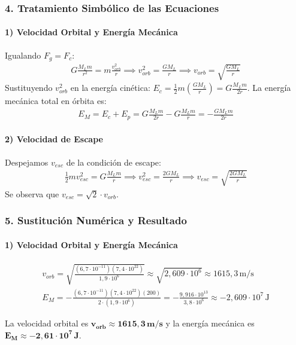 \subsubsection*{4. Tratamiento Simbólico de las Ecuaciones}
\paragraph{1) Velocidad Orbital y Energía Mecánica}
Igualando $F_g = F_c$:
\begin{gather}
    G \frac{M_L m}{r^2} = m \frac{v_{orb}^2}{r} \implies v_{orb}^2 = \frac{G M_L}{r} \implies v_{orb} = \sqrt{\frac{G M_L}{r}}
\end{gather}
Sustituyendo $v_{orb}^2$ en la energía cinética: $E_c = \frac{1}{2}m\left(\frac{G M_L}{r}\right) = G\frac{M_L m}{2r}$.
La energía mecánica total en órbita es:
\begin{gather}
    E_M = E_c + E_p = G\frac{M_L m}{2r} - G\frac{M_L m}{r} = -\frac{G M_L m}{2r}
\end{gather}
\paragraph{2) Velocidad de Escape}
Despejamos $v_{esc}$ de la condición de escape:
\begin{gather}
    \frac{1}{2}mv_{esc}^2 = G\frac{M_L m}{r} \implies v_{esc}^2 = \frac{2G M_L}{r} \implies v_{esc} = \sqrt{\frac{2G M_L}{r}}
\end{gather}
Se observa que $v_{esc} = \sqrt{2} \cdot v_{orb}$.

\subsubsection*{5. Sustitución Numérica y Resultado}
\paragraph{1) Velocidad Orbital y Energía Mecánica}
\begin{gather}
    v_{orb} = \sqrt{\frac{(6,7\cdot10^{-11})(7,4\cdot10^{22})}{1,9\cdot10^6}} \approx \sqrt{2,609 \cdot 10^6} \approx 1615,3 \, \text{m/s} \\
    E_M = -\frac{(6,7\cdot10^{-11})(7,4\cdot10^{22})(200)}{2 \cdot (1,9\cdot10^6)} = -\frac{9,916 \cdot 10^{13}}{3,8 \cdot 10^6} \approx -2,609 \cdot 10^7 \, \text{J}
\end{gather}
\begin{cajaresultado}
La velocidad orbital es $\boldsymbol{v_{orb} \approx 1615,3 \, \textbf{m/s}}$ y la energía mecánica es $\boldsymbol{E_M \approx -2,61 \cdot 10^7 \, \textbf{J}}$.
\end{cajaresultado}
